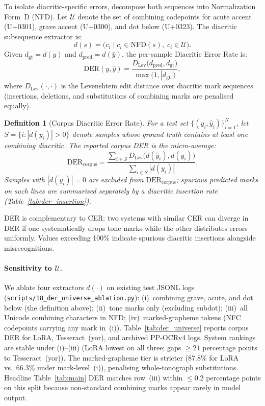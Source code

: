 \documentclass{article}
\newtheorem{definition}{Definition}
\begin{document}
To isolate diacritic-specific errors, decompose both sequences into Normalization Form~D (NFD). Let $\mathcal{U}$ denote the set of combining codepoints for acute accent (U+0301), grave accent (U+0300), and dot below (U+0323). The diacritic subsequence extractor is:
\begin{equation}
d(s) = \bigl(c_i \mid c_i \in \mathrm{NFD}(s),\; c_i \in \mathcal{U}\bigr).
\end{equation}
Given $d_{\mathrm{gt}} = d(y)$ and $d_{\mathrm{pred}} = d(\hat{y})$, the per-sample Diacritic Error Rate is:
\begin{equation}
\mathrm{DER}(y, \hat{y}) = \frac{D_{\mathrm{Lev}}\bigl(d_{\mathrm{pred}}, d_{\mathrm{gt}}\bigr)}{\max\bigl(1, |d_{\mathrm{gt}}|\bigr)},
\end{equation}
where $D_{\mathrm{Lev}}(\cdot,\cdot)$ is the Levenshtein edit distance over diacritic mark sequences (insertions, deletions, and substitutions of combining marks are penalised equally).

\begin{definition}[Corpus Diacritic Error Rate]
For a test set $\{(y_i, \hat{y}_i)\}_{i=1}^{N}$, let $S = \{i : |d(y_i)| > 0\}$ denote samples whose ground truth contains at least one combining diacritic. The reported corpus DER is the micro-average:
\begin{equation}
\mathrm{DER}_{\mathrm{corpus}} = \frac{\sum_{i \in S} D_{\mathrm{Lev}}\bigl(d(\hat{y}_i), d(y_i)\bigr)}{\sum_{i \in S} |d(y_i)|}.
\end{equation}
Samples with $|d(y_i)|{=}0$ are excluded from $\mathrm{DER}_{\mathrm{corpus}}$; spurious predicted marks on such lines are summarised separately by a diacritic insertion rate (Table~\ref{tab:der_insertion}).
\end{definition}

DER is complementary to CER: two systems with similar CER can diverge in DER if one systematically drops tone marks while the other distributes errors uniformly. Values exceeding 100\% indicate spurious diacritic insertions alongside misrecognitions.

\paragraph{Sensitivity to $\mathcal{U}$.}
We ablate four extractors $d(\cdot)$ on existing test JSONL logs (\texttt{scripts/18\_der\_universe\_ablation.py}): (i)~combining grave, acute, and dot below (the definition above); (ii)~tone marks only (excluding subdot); (iii)~all Unicode combining characters in NFD; (iv)~marked-grapheme tokens (NFC codepoints carrying any mark in~(i)). Table~\ref{tab:der_universe} reports corpus DER for LoRA, Tesseract~(yor), and archived PP-OCRv4 logs. System rankings are stable under (i)--(iii) (LoRA lowest on all three; gaps ${\geq}21$ percentage points to Tesseract~(yor)). The marked-grapheme tier is stricter (87.8\% for LoRA vs.\ 66.3\% under mark-level~(i)), penalising whole-tonograph substitutions. Headline Table~\ref{tab:main} DER matches row~(iii) within ${\leq}0.2$ percentage points on this split because non-standard combining marks appear rarely in model output.
\end{document}

